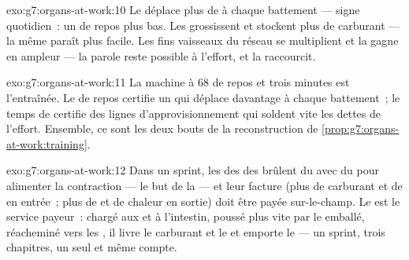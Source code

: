 \begin{solution}{exo:g7:organs-at-work:10}
Le  déplace plus de  à chaque battement --- signe
quotidien~: un  de repos plus bas. Les  grossissent et
stockent plus de carburant --- la même  paraît plus facile. Les
fins vaisseaux du réseau se multiplient et la  gagne en
ampleur --- la parole reste possible à l'effort, et la 
raccourcit.
\end{solution}

\begin{solution}{exo:g7:organs-at-work:11}
La machine à $68$ de repos et trois minutes est l'entraînée. Le
 de repos certifie un  qui déplace davantage à chaque
battement~; le temps de  certifie des lignes
d'approvisionnement qui soldent vite les dettes de l'effort.
Ensemble, ce sont les deux bouts de la reconstruction de
\cref{prop:g7:organs-at-work:training}.
\end{solution}

\begin{solution}{exo:g7:organs-at-work:12}
Dans un sprint, les  des  des  brûlent du
 avec du  pour alimenter la contraction --- le but
de la  --- et leur facture (plus de carburant et de
 en entrée~; plus de  et de chaleur en
sortie) doit être payée sur-le-champ. Le  est le service
payeur~: chargé aux  et à l'intestin, poussé plus vite par le
 emballé, réacheminé vers les , il livre le carburant et
le  et emporte le  --- un sprint, trois
chapitres, un seul et même compte.
\end{solution}

